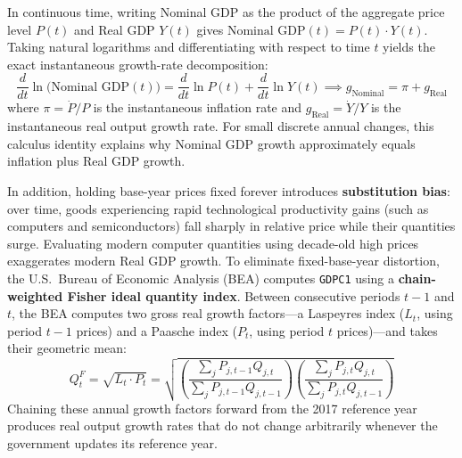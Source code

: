 \documentclass[11pt,letterpaper]{article}
\begin{document}
\begin{casestudy}
In continuous time, writing Nominal GDP as the product of the aggregate price level $P(t)$ and Real GDP $Y(t)$ gives $\text{Nominal GDP}(t) = P(t) \cdot Y(t)$. Taking natural logarithms and differentiating with respect to time $t$ yields the exact instantaneous growth-rate decomposition:
$$\frac{d}{dt}\ln\bigl(\text{Nominal GDP}(t)\bigr) = \frac{d}{dt}\ln P(t) + \frac{d}{dt}\ln Y(t) \implies g_{\text{Nominal}} = \pi + g_{\text{Real}}$$
where $\pi = \dot{P}/P$ is the instantaneous inflation rate and $g_{\text{Real}} = \dot{Y}/Y$ is the instantaneous real output growth rate. For small discrete annual changes, this calculus identity explains why Nominal GDP growth approximately equals inflation plus Real GDP growth.

In addition, holding base-year prices fixed forever introduces \textbf{substitution bias}: over time, goods experiencing rapid technological productivity gains (such as computers and semiconductors) fall sharply in relative price while their quantities surge. Evaluating modern computer quantities using decade-old high prices exaggerates modern Real GDP growth. To eliminate fixed-base-year distortion, the U.S.\ Bureau of Economic Analysis (BEA) computes \texttt{GDPC1} using a \textbf{chain-weighted Fisher ideal quantity index}. Between consecutive periods $t-1$ and $t$, the BEA computes two gross real growth factors—a Laspeyres index ($L_t$, using period $t-1$ prices) and a Paasche index ($P_t$, using period $t$ prices)—and takes their geometric mean:
$$Q_t^F = \sqrt{ L_t \cdot P_t } = \sqrt{ \left(\frac{\sum_{j} P_{j,t-1} Q_{j,t}}{\sum_{j} P_{j,t-1} Q_{j,t-1}}\right) \left(\frac{\sum_{j} P_{j,t} Q_{j,t}}{\sum_{j} P_{j,t} Q_{j,t-1}}\right) }$$
Chaining these annual growth factors forward from the 2017 reference year produces real output growth rates that do not change arbitrarily whenever the government updates its reference year.
\end{casestudy}
\end{document}
